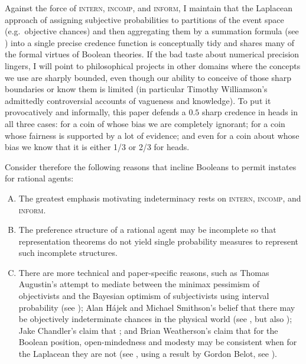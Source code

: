 \documentclass[11pt]{article}
\begin{document}
Against the force of \textsc{intern}, \textsc{incomp}, and
\textsc{inform}, I maintain that the La\-pla\-cean approach of
assigning subjective probabilities to partitions of the event space
(e.g.\ objective chances) and then aggregating them by a summation
formula (see ) into a single precise credence
function is conceptually tidy and shares many of the formal virtues of
Boolean theories. If the bad taste about numerical precision lingers,
I will point to philosophical projects in other domains where the
concepts we use are sharply bounded, even though our ability to
conceive of those sharp boundaries or know them is limited (in
particular Timothy Williamson's admittedly controversial accounts of
vagueness and knowledge). To put it provocatively and informally, this
paper defends a $0.5$ sharp credence in heads in all three cases: for
a coin of whose bias we are completely ignorant; for a coin whose
fairness is supported by a lot of evidence; and even for a coin about
whose bias we know that it is either 1/3 or 2/3 for heads.

Consider therefore the following reasons that incline Booleans to
permit instates for rational agents:

\begin{enumerate}[(A)]
\item The greatest emphasis motivating indeterminacy rests on
  \textsc{intern}, \textsc{incomp}, and \textsc{inform}.
\item The preference structure of a rational agent may be incomplete
  so that representation theorems do not yield single probability
  measures to represent such incomplete
  structures.\label{page:houwieve}
\item There are more technical and paper-specific reasons, such as
  Thomas Augustin's attempt to mediate between the minimax pessimism
  of objectivists and the Bayesian optimism of subjectivists using
  interval probability (see ); Alan
  H{\'a}jek and Michael Smithson's belief that there may be
  objectively indeterminate chances in the physical world (see
  , but also ); Jake Chandler's claim that 
  ; and Brian Weatherson's claim that for the
  Boolean position, open-mindedness and modesty may be consistent when
  for the Laplacean they are not (see , using
  a result by Gordon Belot, see ).
\end{enumerate}
\end{document}
